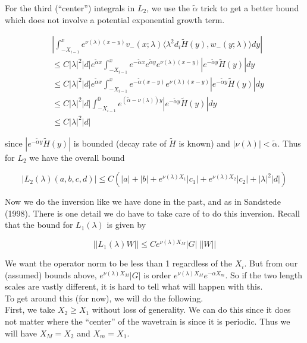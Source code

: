 \documentclass[12pt]{article}
\begin{document}
\begin{enumerate}
For the third (``center'') integrals in $L_2$, we use the $\tilde{\alpha}$ trick to get a better bound which does not involve a potential exponential growth term.

\begin{align*}
&\left| \int_{-X_{i-1}}^x 
e^{\nu(\lambda)(x-y)} v_-(x; \lambda) \langle \lambda^2 d_i \tilde{H}(y), w_-(y; \lambda) \rangle dy \right| \\
&\leq C |\lambda|^2 |d| e^{\tilde{\alpha}x} \int_{-X_{i-1}}^x e^{-\tilde{\alpha}x} e^{\tilde{\alpha}y} e^{\nu(\lambda)(x-y)} |e^{-\tilde{\alpha}y}\tilde{H}(y)|dy \\
&\leq C |\lambda|^2 |d| e^{\tilde{\alpha}x} \int_{-X_{i-1}}^x e^{-\tilde{\alpha}(x-y)} e^{\nu(\lambda)(x-y)} |e^{-\tilde{\alpha}y}\tilde{H}(y)|dy \\
&\leq C |\lambda|^2 |d| \int_{-X_{i-1}}^0 e^{(\tilde{\alpha}-\nu(\lambda))y} |e^{-\tilde{\alpha}y}\tilde{H}(y)|dy \\
&\leq C |\lambda|^2 |d|
\end{align*}

since $|e^{-\tilde{\alpha}y}\tilde{H}(y)|$ is bounded (decay rate of $\tilde{H}$ is known) and $|\nu(\lambda)| < \tilde{\alpha}$. Thus for $L_2$ we have the overall bound

\[
|L_2(\lambda)(a,b,c,d)| \leq C (|a| + |b| + e^{\nu(\lambda)X_1}|c_1| + e^{\nu(\lambda)X_2}|c_2| + |\lambda|^2 |d| )
\]

Now we do the inversion like we have done in the past, and as in Sandstede (1998). There is one detail we do have to take care of to do this inversion. Recall that the bound for $L_1(\lambda)$ is given by

\[
||L_1(\lambda)W|| \leq C e^{\nu(\lambda)X_M} |G| \: ||W||
\]

We want the operator norm to be less than 1 regardless of the $X_i$. But from our (assumed) bounds above, $e^{\nu(\lambda)X_M} |G|$ is order $e^{\nu(\lambda)X_M} e^{-\alpha X_m}$. So if the two length scales are vastly different, it is hard to tell what will happen with this.\\

To get around this (for now), we will do the following.\\

First, we take $X_2 \geq X_1$ without loss of generality. We can do this since it does not matter where the ``center'' of the wavetrain is since it is periodic. Thus we will have $X_M = X_2$ and $X_m = X_1$. \\


\end{enumerate}
\end{document}
